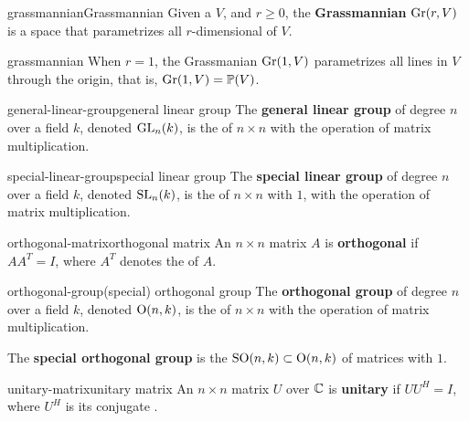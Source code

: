 \begin{topic}{grassmannian}{Grassmannian}
    Given a  $V$, and $r \ge 0$, the \textbf{Grassmannian} $\textup{Gr}(r, V)$ is a space that parametrizes all $r$-dimensional  of $V$.
\end{topic}

\begin{example}{grassmannian}
    When $r = 1$, the Grassmanian $\textup{Gr}(1, V)$ parametrizes all lines in $V$ through the origin, that is, $\textup{Gr}(1, V) = \mathbb{P}(V)$.
\end{example}

\begin{topic}{general-linear-group}{general linear group}
    The \textbf{general linear group} of degree $n$ over a field $k$, denoted $\textup{GL}_n(k)$, is the  of $n \times n$  with the operation of matrix multiplication.
\end{topic}

\begin{topic}{special-linear-group}{special linear group}
    The \textbf{special linear group} of degree $n$ over a field $k$, denoted $\textup{SL}_n(k)$, is the  of $n \times n$  with  $1$, with the operation of matrix multiplication.
\end{topic}

\begin{topic}{orthogonal-matrix}{orthogonal matrix}
    An $n \times n$ matrix $A$ is \textbf{orthogonal} if $A A^T = I$, where $A^T$ denotes the  of $A$.
\end{topic}

\begin{topic}{orthogonal-group}{(special) orthogonal group}
    The \textbf{orthogonal group} of degree $n$ over a field $k$, denoted $\textup{O}(n, k)$, is the  of $n \times n$  with the operation of matrix multiplication.
    
    The \textbf{special orthogonal group} is the  $\textup{SO}(n, k) \subset \textup{O}(n, k)$ of matrices with  $1$.
\end{topic}

\begin{topic}{unitary-matrix}{unitary matrix}
    An $n \times n$ matrix $U$ over $\mathbb{C}$ is \textbf{unitary} if $UU^H = I$, where $U^H$ is its conjugate .
\end{topic}


